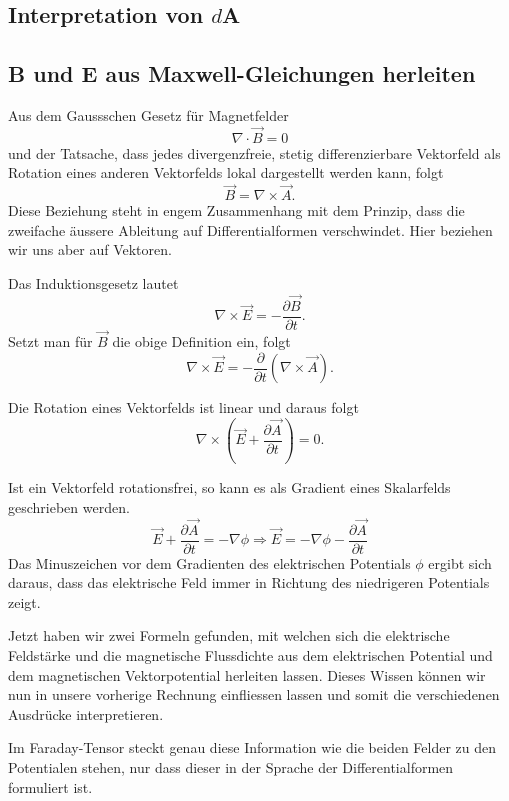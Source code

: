 \subsection{Interpretation von $d$A}

\subsection{B und E aus Maxwell-Gleichungen herleiten}
Aus dem Gaussschen Gesetz für Magnetfelder
\begin{equation}
	\nabla \cdot \vec{B} = 0
\end{equation}
und der Tatsache, dass jedes divergenzfreie, stetig differenzierbare Vektorfeld als Rotation eines anderen Vektorfelds lokal dargestellt werden kann,
folgt
\begin{equation}
	\vec{B} = \nabla \times \vec{A}.
\end{equation}
Diese Beziehung steht in engem Zusammenhang mit dem Prinzip, dass die zweifache äussere Ableitung auf Differentialformen verschwindet. Hier beziehen wir uns aber auf Vektoren.

Das Induktionsgesetz lautet
\begin{equation}
	\nabla \times \vec{E} = - \frac{\partial \vec{B}}{\partial t}.
\end{equation}
Setzt man für $\vec{B}$ die obige Definition ein, folgt
\begin{equation}
	\nabla \times \vec{E} = - \frac{\partial}{\partial t}(\nabla \times \vec{A}).
\end{equation}

Die Rotation eines Vektorfelds ist linear und daraus folgt
\begin{equation}
	\nabla \times \left( \vec{E} + \frac{\partial \vec{A}}{\partial t}\right) = 0.
\end{equation}

Ist ein Vektorfeld rotationsfrei, so kann es als Gradient eines Skalarfelds geschrieben werden.
\begin{equation}
	\vec{E} + \frac{\partial \vec{A}}{\partial t} = -\nabla \phi \Rightarrow \vec{E} = -\nabla \phi -\frac{\partial \vec{A}}{\partial t}
\end{equation}
Das Minuszeichen vor dem Gradienten des elektrischen Potentials $\phi$ ergibt sich daraus, dass das elektrische Feld immer in Richtung des niedrigeren Potentials zeigt.

Jetzt haben wir zwei Formeln gefunden, mit welchen sich die elektrische Feldstärke und die magnetische Flussdichte aus dem elektrischen Potential und dem magnetischen Vektorpotential herleiten lassen. Dieses Wissen können wir nun in unsere vorherige Rechnung einfliessen lassen und somit die verschiedenen Ausdrücke interpretieren.

Im Faraday-Tensor steckt genau diese Information wie die beiden Felder zu den Potentialen stehen, nur dass dieser in der Sprache der Differentialformen formuliert ist.


